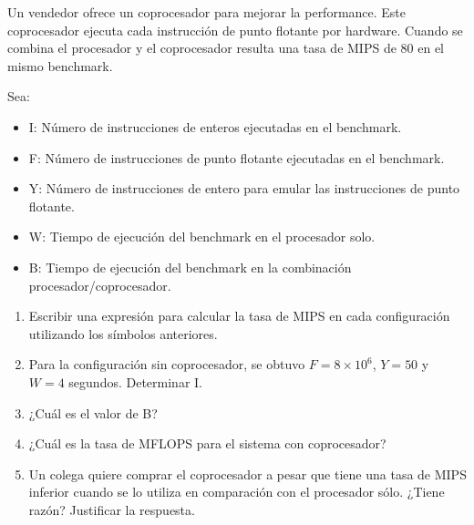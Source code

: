 Un vendedor ofrece un coprocesador para mejorar la performance. Este coprocesador ejecuta cada instrucción de punto flotante por hardware. Cuando se combina el procesador y el coprocesador resulta una tasa de MIPS de 80 en el mismo benchmark.

Sea:

\begin{itemize}
 \item I: Número de instrucciones de enteros ejecutadas en el benchmark.
 \item F: Número de instrucciones de punto flotante ejecutadas en el benchmark.
 \item Y: Número de instrucciones de entero para emular las instrucciones de punto flotante.
 \item W: Tiempo de ejecución del benchmark en el procesador solo.
 \item B: Tiempo de ejecución del benchmark en la combinación procesador/coprocesador.
\end{itemize}

\begin{enumerate}
 \item Escribir una expresión para calcular la tasa de MIPS en cada configuración utilizando los símbolos anteriores.
 \item Para la configuración sin coprocesador, se obtuvo $F = 8 \times 10^6$, $Y = 50$ y $W = 4$ segundos. Determinar I.
 \item ¿Cuál es el valor de B?
 \item ¿Cuál es la tasa de MFLOPS para el sistema con coprocesador?
 \item Un colega quiere comprar el coprocesador a pesar que tiene una tasa de MIPS inferior cuando se lo utiliza en comparación con el procesador sólo. ¿Tiene razón? Justificar la respuesta.
\end{enumerate}


